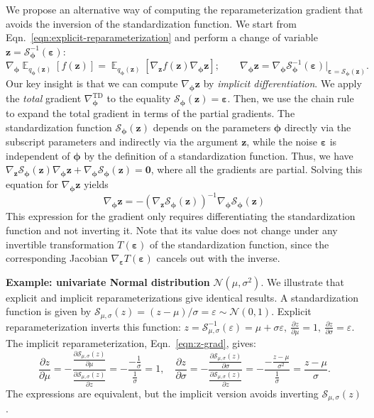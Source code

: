 \documentclass{article}
\DeclareMathOperator{\E}{\mathbb{E}}
\let\vec\bm
\newcommand{\Sz}{\mathcal{S}_{\vec{\phi}}(\vec{z})}
\newcommand{\invS}{\mathcal{S}^{-1}_{\vec{\phi}}(\vec{\varepsilon})}
\newcommand{\SNormal}{\mathcal{S}_{\mu, \sigma}(z)}
\newcommand{\invSNormal}{\mathcal{S}^{-1}_{\mu, \sigma}(\varepsilon)}
\begin{document}
We propose an alternative way of computing the reparameterization gradient that avoids the inversion of the standardization function.
We start from Eqn.~\eqref{eqn:explicit-reparameterization} and perform a change of variable $\vec{z} = \invS$:
\begin{equation}
    \nabla_{\vec{\phi}} \E_{q_{\vec{\phi}} (\vec{z})} \left[f(\vec{z})\right] = \E_{q_{\vec{\phi}} (\vec{z})} \left[\nabla_{\vec{z}} f(\vec{z}) \nabla_{\vec{\phi}} \vec{z}\right]; \qquad \nabla_{\vec{\phi}} \vec{z} = \nabla_{\vec{\phi}} \invS |_{\vec{\varepsilon} = \Sz}.
    \label{eqn:explicit-grad-z}
\end{equation}
Our key insight is that we can compute $\nabla_{\vec{\phi}} \vec{z}$ by \emph{implicit differentiation}.
We apply the \emph{total} gradient $\nabla^{\mathrm{TD}}_{\vec{\phi}}$ to the equality $\Sz = \vec{\varepsilon}$.
Then, we use the chain rule to expand the total gradient in terms of the partial gradients.
The standardization function $\Sz$ depends on the parameters $\vec{\phi}$ directly via the subscript parameters and indirectly via the argument $\vec{z}$, while the noise $\vec{\varepsilon}$ is independent of $\vec{\phi}$ by the definition of a standardization function.
Thus, we have
$\nabla_{\vec{z}} \Sz \nabla_{\vec{\phi}} \vec{z} + \nabla_{\vec{\phi}} \Sz = \vec{0}$,
where all the gradients are partial.
Solving this equation for $\nabla_{\vec{\phi}} \vec{z}$ yields
\begin{equation}
    \boxed{ \nabla_{\vec{\phi}} \vec{z} = -(\nabla_{\vec{z}} \Sz)^{-1} \nabla_{\vec{\phi}} \Sz }
    \label{eqn:z-grad}
\end{equation}
This expression for the gradient only requires differentiating the standardization function and not inverting it.
Note that its value does not change under any invertible transformation $T(\vec{\varepsilon})$ of the standardization function, since the corresponding Jacobian $\nabla_{\vec{\varepsilon}} T(\vec{\varepsilon})$ cancels out with the inverse.

\textbf{Example: univariate Normal distribution} $\mathcal{N}(\mu, \sigma^2)$.
We illustrate that explicit and implicit reparameterizations give identical results.
A standardization function is given by $\SNormal = (z - \mu)/\sigma = \varepsilon \sim \mathcal{N}(0, 1)$.
Explicit reparameterization inverts this function: $z = \invSNormal = \mu + \sigma \varepsilon, \ \frac{\partial z}{\partial \mu} = 1, \ \frac{\partial z}{\partial \sigma} = \varepsilon$.
The implicit reparameterization, Eqn.~\eqref{eqn:z-grad}, gives:
\begin{equation}
    \frac{\partial z}{\partial \mu} = -\frac{ \frac{\partial \SNormal} {\partial \mu} }{\frac{\partial \SNormal}{\partial z}} = -\frac{-\frac{1}{\sigma}}{\frac{1}{\sigma}} = 1, \quad \frac{\partial z}{\partial \sigma} = -\frac{ \frac{\partial \SNormal} {\partial \sigma} }{\frac{\partial \SNormal}{\partial z}} = -\frac{-\frac{z - \mu}{\sigma^2}}{\frac{1}{\sigma}} = \frac{z - \mu}{\sigma}.
\end{equation}
The expressions are equivalent, but the implicit version avoids inverting $\SNormal$.
\end{document}
